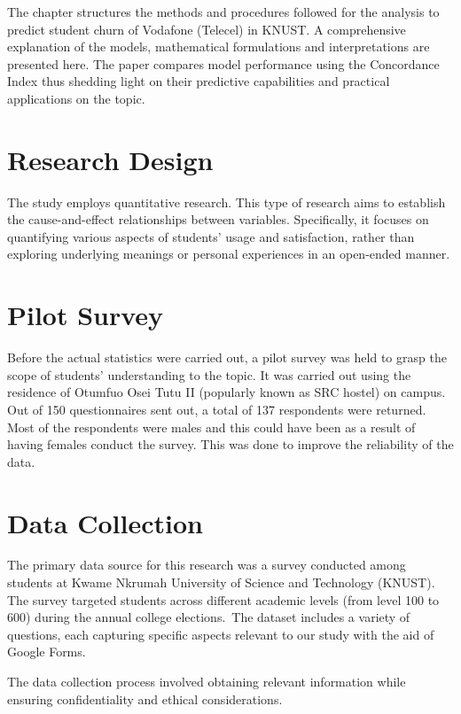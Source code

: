 \documentclass[12pt]{report} %
\begin{document}
The chapter structures the methods and procedures followed for the analysis to predict student churn of Vodafone (Telecel) in KNUST. A comprehensive explanation of the models, mathematical formulations and interpretations are presented here. The paper compares model performance using the Concordance Index thus shedding light on their predictive capabilities and practical applications on the topic.

\section{Research Design}

The study employs quantitative research. This type of research aims to establish the cause-and-effect relationships between variables. Specifically, it focuses on quantifying various aspects of students’ usage and satisfaction, rather than exploring underlying meanings or personal experiences in an open-ended manner.

\section{Pilot Survey}

Before the actual statistics were carried out, a pilot survey was held to grasp the scope of students’ understanding to the topic. It was carried out using the residence of Otumfuo Osei Tutu II (popularly known as SRC hostel) on campus. Out of 150 questionnaires sent out, a total of 137 respondents were returned. Most of the respondents were males and this could have been as a result of having females conduct the survey. This was done to improve the reliability of the data.

\section{Data Collection}

The primary data source for this research was a survey conducted among students at Kwame Nkrumah University of Science and Technology (KNUST). The survey targeted students across different academic levels (from level 100 to 600) during the annual college elections. The dataset includes a variety of questions, each capturing specific aspects relevant to our study with the aid of Google Forms.

The data collection process involved obtaining relevant information while ensuring confidentiality and ethical considerations.
\end{document}
